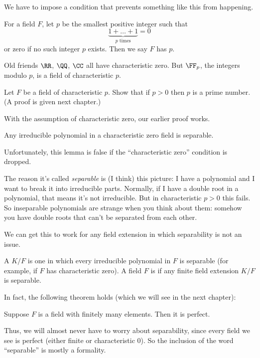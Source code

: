 We have to impose a condition that prevents something like this from happening.
\begin{definition}
	For a field $F$, let $p$ be the smallest positive integer such that
	\[ \underbrace{1+\dots+1}_{\text{$p$ times}} = 0 \]
	or zero if no such integer $p$ exists.
	Then we say $F$ has  $p$.
\end{definition}
\begin{example}
	Old friends $\RR$, $\QQ$, $\CC$ all have characteristic zero.
	But $\FF_p$, the integers modulo $p$, is a field of characteristic $p$.
\end{example}
\begin{exercise}
	Let $F$ be a field of characteristic $p$.
	Show that if $p > 0$ then $p$ is a prime number.
	(A proof is given next chapter.)
\end{exercise}
With the assumption of characteristic zero, our earlier proof works.
\begin{lemma}
	Any irreducible polynomial in a characteristic zero field is separable.
\end{lemma}
Unfortunately, this lemma is false if the ``characteristic zero'' condition is dropped.

\begin{remark}
	The reason it's called \emph{separable} is (I think) this picture:
	I have a polynomial and I want to break it into irreducible parts.
	Normally, if I have a double root in a polynomial, that means it's not irreducible.
	But in characteristic $p > 0$ this fails.
	So inseparable polynomials are strange when you think about them: somehow
	you have double roots that can't be separated from each other.
\end{remark}

We can get this to work for any field extension in which separability is not an issue.
\begin{definition}
	A  $K/F$ is one in which every irreducible
	polynomial in $F$ is separable (for example, if $F$ has characteristic zero).
	A field $F$ is  if any finite field extension $K/F$ is separable.
\end{definition}
In fact, the following theorem holds (which we will see in the next chapter):
\begin{theorem}
	Suppose $F$ is a field with finitely many elements. Then it is perfect.
\end{theorem}
Thus, we will almost never have to worry about separability,
since every field we see is perfect (either finite or characteristic $0$).
So the inclusion of the word ``separable'' is mostly a formality.

